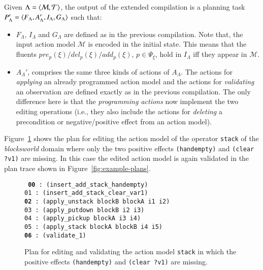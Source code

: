 Given $\Lambda={\langle \mathcal{M},\mathcal{T} \rangle}$, the output of the extended compilation is a planning task $P_{\Lambda}'={\langle F_{\Lambda},A_{\Lambda}',I_{\Lambda},G_{\Lambda} \rangle}$ such that:

\begin{itemize}
\item $F_{\Lambda}$, $I_{\Lambda}$ and $G_{\Lambda}$ are defined as in the previous compilation. Note that, the input action model $\mathcal{M}$ is encoded in the initial state. This means that the fluents $pre_p(\xi)/del_p(\xi)/add_p(\xi)$, $p\in \Psi_\xi$, hold in $I_{\Lambda}$ iff they appear in $\mathcal{M}$.
\item $A_{\Lambda}'$, comprises the same three kinds of actions of $A_{\Lambda}$. The actions for {\em applying} an already programmed action model and the actions for {\em validating} an observation are defined exactly as in the previous compilation. The only difference here is that the {\em programming actions} now implement the two editing operations (i.e., they also include the actions for {\em deleting} a precondition or negative/positive effect from an action model).
\end{itemize}

Figure~\ref{fig:plan-pdistance} shows the plan for editing the action model of the operator {\tt\small stack} of the {\em blocksworld} domain where only the two positive effects {\tt\small (handempty)} and {\tt\small (clear ?v1)} are missing. In this case the edited action model is again validated in the plan trace shown in Figure~\ref{fig:example-plans}.

\begin{figure}[hbt!]
{\footnotesize\tt
  {\bf 00} : (insert\_add\_stack\_handempty)\\
  01 : (insert\_add\_stack\_clear\_var1)\\
  {\bf 02} : (apply\_unstack blockB blockA i1 i2)\\
  03 : (apply\_putdown blockB i2 i3)\\
  04 : (apply\_pickup blockA i3 i4)\\
  05 : (apply\_stack blockA blockB i4 i5)\\
  {\bf 06} : (validate\_1)
}
\caption{\small Plan for editing and validating the action model {\tt\small{stack}} in which the positive effects {\tt\small{(handempty)}} and {\tt\small{(clear ?v1)}} are missing.}
\label{fig:plan-pdistance}
\end{figure}

